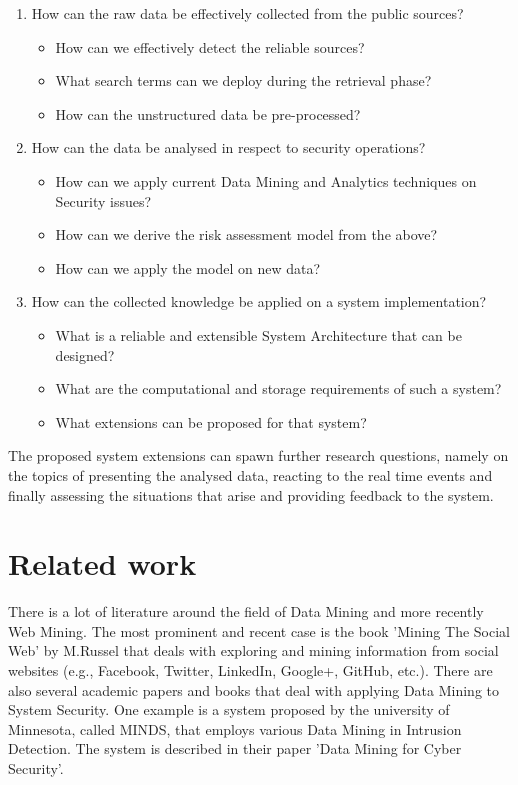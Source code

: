 \documentclass[12pt]{article}
\begin{document}
\begin{enumerate}
	\item How can the raw data be effectively collected from the public sources? 
	\begin{itemize}
		\item How can we effectively detect the reliable sources?
		\item What search terms can we deploy during the retrieval phase?
		\item How can the unstructured data be pre-processed? 
	\end{itemize}
	\item How can the data be analysed in respect to security operations?
	\begin{itemize}
		\item How can we apply current Data Mining and Analytics techniques on Security issues?
		\item How can we derive the risk assessment model from the above?
		\item How can we apply the model on new data?
	\end{itemize}
	\item	How can the collected knowledge be applied on a system implementation?
	\begin{itemize}
		\item What is a reliable and extensible System Architecture that can be designed?
		\item What are the computational and storage requirements of such a system?
		\item What extensions can be proposed for that system?
	\end{itemize}
\end{enumerate}

The proposed system extensions can spawn further research questions, namely on the topics of presenting the analysed data, reacting to the real time events and finally assessing the situations that arise and providing feedback to the system.


\section{Related work}
There is a lot of literature around the field of Data Mining and more recently Web Mining. The most prominent and recent case is the book 'Mining The Social Web' by M.Russel that deals with exploring and mining information from social websites (e.g., Facebook, Twitter, LinkedIn, Google+, GitHub, etc.). There are also several academic papers and books that deal with applying Data Mining to System Security. One example is a system proposed by the university of Minnesota, called MINDS, that employs various Data Mining in Intrusion Detection. The system is described in their paper 'Data Mining for Cyber Security'. 
\end{document}
